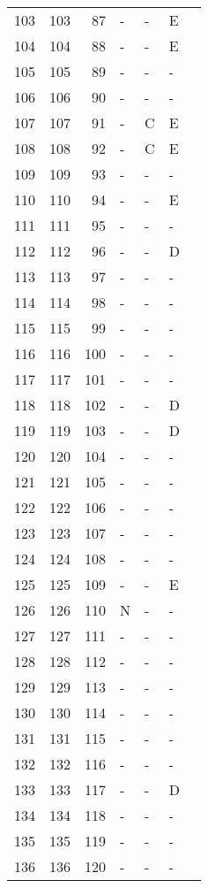 \begin{longtable}{rrrllll}
  103 & 103 &  87 & - & - & E &  \\ 
  104 & 104 &  88 & - & - & E &  \\ 
  105 & 105 &  89 & - & - & - &  \\ 
  106 & 106 &  90 & - & - & - &  \\ 
  107 & 107 &  91 & - & C & E &  \\ 
  108 & 108 &  92 & - & C & E &  \\ 
  109 & 109 &  93 & - & - & - &  \\ 
  110 & 110 &  94 & - & - & E &  \\ 
  111 & 111 &  95 & - & - & - &  \\ 
  112 & 112 &  96 & - & - & D &  \\ 
  113 & 113 &  97 & - & - & - &  \\ 
  114 & 114 &  98 & - & - & - &  \\ 
  115 & 115 &  99 & - & - & - &  \\ 
  116 & 116 & 100 & - & - & - &  \\ 
  117 & 117 & 101 & - & - & - &  \\ 
  118 & 118 & 102 & - & - & D &  \\ 
  119 & 119 & 103 & - & - & D &  \\ 
  120 & 120 & 104 & - & - & - &  \\ 
  121 & 121 & 105 & - & - & - &  \\ 
  122 & 122 & 106 & - & - & - &  \\ 
  123 & 123 & 107 & - & - & - &  \\ 
  124 & 124 & 108 & - & - & - &  \\ 
  125 & 125 & 109 & - & - & E &  \\ 
  126 & 126 & 110 & N & - & - &  \\ 
  127 & 127 & 111 & - & - & - &  \\ 
  128 & 128 & 112 & - & - & - &  \\ 
  129 & 129 & 113 & - & - & - &  \\ 
  130 & 130 & 114 & - & - & - &  \\ 
  131 & 131 & 115 & - & - & - &  \\ 
  132 & 132 & 116 & - & - & - &  \\ 
  133 & 133 & 117 & - & - & D &  \\ 
  134 & 134 & 118 & - & - & - &  \\ 
  135 & 135 & 119 & - & - & - &  \\ 
  136 & 136 & 120 & - & - & - &  \\ 

\end{longtable}
